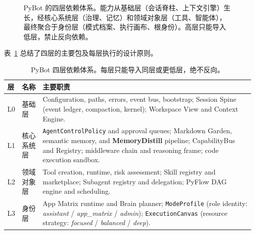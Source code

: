 \documentclass[11pt,a4paper]{article}
\begin{document}
\begin{figure}[h]
\centering
{}
\caption{PyBot 的四层依赖体系。能力从基础层（会话脊柱、上下文引擎）生长，经核心系统层（治理、记忆）和领域对象层（工具、智能体），最终聚合于身份层（模式档案、执行画布、根身份）。高层只能导入低层，禁止反向依赖。}
\label{fig:arch}
\end{figure}

表~\ref{tab:layers} 总结了四层的主要包及每层执行的设计原则。

\begin{table}[h]
\centering
\small
\begin{tabularx}{\textwidth}{llX}
\toprule
\textbf{层} & \textbf{名称} & \textbf{主要职责} \\
\midrule
L0 & 基础层 & Configuration, paths, errors, event bus, bootstrap; Session Spine (event ledger, compaction, kernel); Workspace View and Context Engine. \\
L1 & 核心系统层 & \texttt{AgentControlPolicy} and approval queues; Markdown Garden, semantic memory, and \textbf{MemoryDistill} pipeline; CapabilityBus and Registry; middleware chain and reasoning frame; code execution sandbox. \\
L2 & 领域对象层 & Tool creation, runtime, risk assessment; Skill registry and marketplace; Subagent registry and delegation; PyFlow DAG engine and scheduling. \\
L3 & 身份层 & App Matrix runtime and Brain planner; \texttt{ModeProfile} (role identity: \textit{assistant} / \textit{app\_matrix} / \textit{admin}); \texttt{ExecutionCanvas} (resource strategy: \textit{focused} / \textit{balanced} / \textit{deep}). \\
\bottomrule
\end{tabularx}
\caption{PyBot 四层依赖体系。每层只能导入同层或更低层，绝不反向。}
\label{tab:layers}
\end{table}
\end{document}
